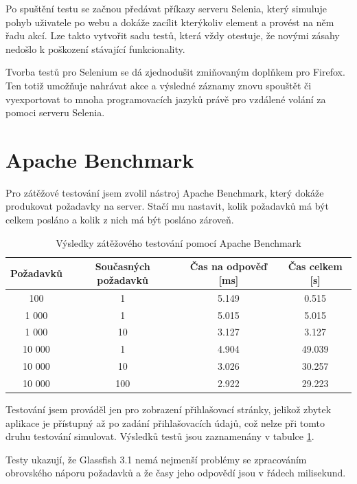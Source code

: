\documentclass[11pt,twoside,a4paper]{book}
\begin{document}
Po spuštění testu se začnou předávat příkazy serveru Selenia, který simuluje pohyb uživatele po webu a dokáže zacílit kterýkoliv element a provést na něm řadu akcí. Lze takto vytvořit sadu testů, která vždy otestuje, že novými zásahy nedošlo k poškození stávající funkcionality.

Tvorba testů pro Selenium se dá zjednodušit zmiňovaným doplňkem pro Firefox. Ten totiž umožňuje nahrávat akce a výsledné záznamy znovu spouštět či vyexportovat to mnoha programovacích jazyků právě pro vzdálené volání za pomoci serveru Selenia.

\section{Apache Benchmark}

Pro zátěžové testování jsem zvolil nástroj Apache Benchmark, který dokáže produkovat požadavky na server. Stačí mu nastavit, kolik požadavků má být celkem posláno a kolik z nich má být posláno zároveň.

\begin{table}[!t]
	\begin{center}
		\begin{tabular}[b]{|c|c|c|c|}
		\hline
		Požadavků & Současných požadavků & Čas na odpověď [ms] & Čas celkem [s] \\
		\hline		
		100 & 1 &  5.149 &  0.515 \\
		\hline
		1 000 & 1 & 5.015 & 5.015 \\
		\hline
		1 000 & 10 & 3.127 & 3.127 \\
		\hline
		10 000 & 1 & 4.904 & 49.039 \\
		\hline
		10 000 & 10 & 3.026 & 30.257 \\
		\hline
		10 000 & 100 & 2.922 & 29.223 \\
		\hline
		\end{tabular}
	\end{center}
	\caption{Výsledky zátěžového testování pomocí Apache Benchmark}
	\label{tab:zatezove_testovani}
\end{table}

Testování jsem prováděl jen pro zobrazení přihlašovací stránky, jelikož zbytek aplikace je přístupný až po zadání přihlašovacích údajů, což nelze při tomto druhu testování simulovat. Výsledků testů jsou zaznamenány v tabulce \ref{tab:zatezove_testovani}. 

\newpage

Testy ukazují, že Glassfish 3.1 nemá nejmenší problémy se zpracováním obrovského náporu požadavků a že časy jeho odpovědí jsou v řádech milisekund.
\end{document}
